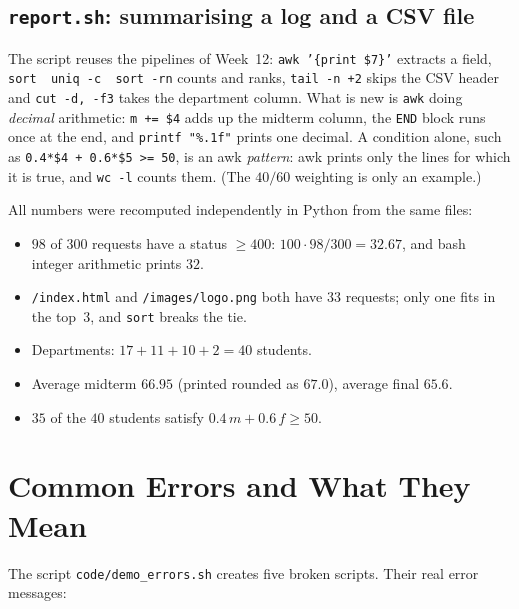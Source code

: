 \documentclass[11pt,a4paper]{article}
\newcommand{\cmd}[1]{\texttt{#1}}
\begin{document}
\subsection{\texttt{report.sh}: summarising a log and a CSV file}




The script reuses the pipelines of Week~12: \cmd{awk '\{print \$7\}'} extracts a field, \cmd{sort \textbar\ uniq -c \textbar\ sort -rn} counts and ranks, \cmd{tail -n +2} skips the CSV header and \cmd{cut -d, -f3} takes the department column. What is new is \cmd{awk} doing \emph{decimal} arithmetic: \texttt{m += \$4} adds up the midterm column, the \texttt{END} block runs once at the end, and \texttt{printf "\%.1f"} prints one decimal. A condition alone, such as \texttt{0.4*\$4 + 0.6*\$5 >= 50}, is an awk \emph{pattern}: awk prints only the lines for which it is true, and \cmd{wc -l} counts them. (The $40/60$ weighting is only an example.)

\begin{example}
All numbers were recomputed independently in Python from the same files:
\begin{itemize}
  \item $98$ of $300$ requests have a status $\ge 400$: $100 \cdot 98 / 300 = 32.67$, and bash integer arithmetic prints $32$.
  \item \texttt{/index.html} and \texttt{/images/logo.png} both have $33$ requests; only one fits in the top~3, and \cmd{sort} breaks the tie.
  \item Departments: $17 + 11 + 10 + 2 = 40$ students.
  \item Average midterm $66.95$ (printed rounded as $67.0$), average final $65.6$.
  \item $35$ of the $40$ students satisfy $0.4\,m + 0.6\,f \ge 50$.
\end{itemize}
\end{example}

\section{Common Errors and What They Mean}
\label{sec:errors}

The script \texttt{code/demo\_errors.sh} creates five broken scripts. Their real error messages:


\end{document}
